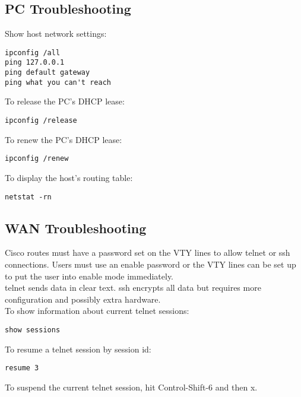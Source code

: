 \subsection{PC Troubleshooting}

Show host network settings:

\begin{verbatim}
ipconfig /all
ping 127.0.0.1
ping default gateway
ping what you can't reach
\end{verbatim}

To release the PC's DHCP lease:

\begin{verbatim}
ipconfig /release
\end{verbatim}

To renew the PC's DHCP lease:

\begin{verbatim}
ipconfig /renew
\end{verbatim}

To display the host's routing table:

\begin{verbatim}
netstat -rn
\end{verbatim}

\subsection{WAN Troubleshooting}

Cisco routes must have a password set on the VTY lines to allow telnet or
ssh connections. Users must use an enable password or the VTY lines can be
set up to put the user into enable mode immediately.\\

telnet sends data in clear text. ssh encrypts all data but requires more
configuration and possibly extra hardware.\\

To show information about current telnet sessions:

\begin{verbatim}
show sessions
\end{verbatim}

To resume a telnet session by session id:

\begin{verbatim}
resume 3
\end{verbatim}

To suspend the current telnet session, hit Control-Shift-6 and then x.\\

